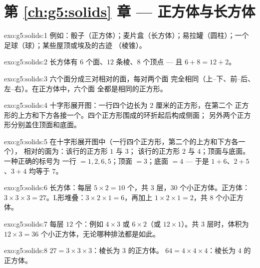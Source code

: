 \section*{第 \ref{ch:g5:solids} 章 --- 正方体与长方体}

\begin{solution}{exo:g5:solids:1}
例如：骰子（正方体）；麦片盒（长方体）；易拉罐（圆柱）；一个
足球（球）；某些屋顶或埃及的古迹
（棱锥）。
\end{solution}

\begin{solution}{exo:g5:solids:2}
长方体有 $6$ 个面、$12$ 条棱、$8$ 个顶点 --- 且
$6 + 8 = 12 + 2$。\checkmark
\end{solution}

\begin{solution}{exo:g5:solids:3}
六个面分成三对相对的面，每对两个面
完全相同（上--下、前--后、左--右）。在正方体中，六个面
全都是相同的正方形。
\end{solution}

\begin{solution}{exo:g5:solids:4}
十字形展开图：一行四个边长为 $2$ 厘米的正方形，在第二个
正方形的上方和下方各接一个。四个正方形围成的环折起后构成侧面；
另外两个正方形分别盖住顶面和底面。
\end{solution}

\begin{solution}{exo:g5:solids:5}
在十字形展开图中（一行四个正方形，第二个的上方和下方各一个），
相对的面为：该行的正方形 $1$ 与 $3$；
该行的正方形 $2$ 与 $4$；顶面与底面。一种正确的标号为
一行 $= 1, 2, 6, 5$；顶面 $= 3$；底面 $= 4$
--- 于是 $1{+}6$、$2{+}5$、$3{+}4$ 均等于 $7$。
\end{solution}

\begin{solution}{exo:g5:solids:6}
长方体：每层 $5 \times 2 = 10$ 个，共 $3$ 层，$30$ 个小正方体。正方体：
$3 \times 3 \times 3 = 27$。L形堆叠：$3 \times 2 \times 1 = 6$，再加上
$1 \times 2 \times 1 = 2$，共 $8$ 个小正方体。
\end{solution}

\begin{solution}{exo:g5:solids:7}
每层 $12$ 个：例如 $4 \times 3$ 或 $6 \times 2$（或
$12 \times 1$）。共 $3$ 层时，体积为
$12 \times 3 = 36$ 个小正方体，无论哪种排法都是如此。
\end{solution}

\begin{solution}{exo:g5:solids:8}
$27 = 3 \times 3 \times 3$：棱长为 $3$ 的正方体。
$64 = 4 \times 4 \times 4$：棱长为 $4$ 的正方体。
\end{solution}

